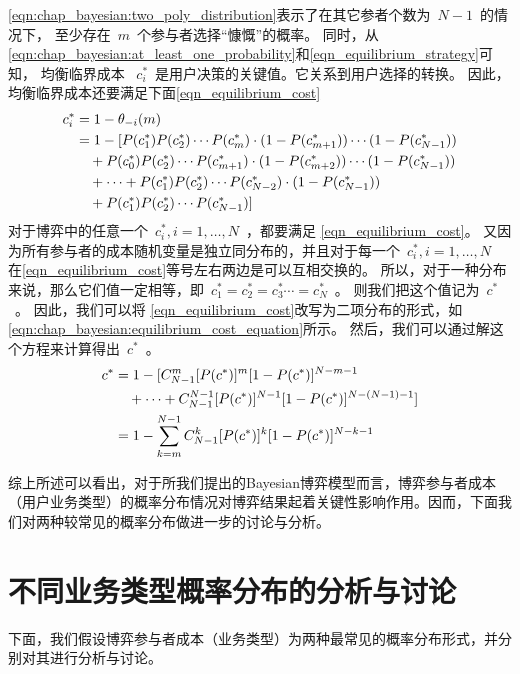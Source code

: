 \eqref{eqn:chap_bayesian:two_poly_distribution}表示了在其它参者个数为~$N-1$~的情况下，
至少存在~$m$~个参与者选择“慷慨”的概率。
同时，从\eqref{eqn:chap_bayesian:at_least_one_probability}和\eqref{eqn_equilibrium_strategy}可知，
均衡临界成本 ~$c_i^*$~是用户决策的关键值。它关系到用户选择的转换。
因此，均衡临界成本还要满足下面\eqref{eqn_equilibrium_cost}
\begin{align}
    c_i^* &= 1 - \theta_{-i} (m) \notag \\
     & =1 - [P(c_1^*)P(c_2^*)\cdots P(c_{m}^*) \cdot (1-P(c_{m+1}^*)) \cdots(1-P(c_{N-1}^*)) \notag \\ 
    & \quad +  P(c_0^*)P(c_2^*)\cdots P(c_{m+1}^*) \cdot (1-P(c_{m+2}^*)) \cdots(1-P(c_{N-1}^*)) \notag \\ 
    & \quad + \cdots  + P(c_1^*)P(c_2^*)\cdots P(c_{N-2}^*) \cdot (1-P(c_{N-1}^*)) \notag \\
    & \quad +  P(c_1^*)P(c_2^*)\cdots P(c_{N-1}^*) ]
    \label{eqn_equilibrium_cost} 
\end{align}
对于博弈中的任意一个~$c_i^*, i=1,\ldots, N$~，都要满足
\eqref{eqn_equilibrium_cost}。
又因为所有参与者的成本随机变量是独立同分布的，并且对于每一个~$c_i^*, i=1,\ldots, N$~
在\eqref{eqn_equilibrium_cost}等号左右两边是可以互相交换的。
所以，对于一种分布来说，那么它们值一定相等，即~$c_1^* = c_2^* = c_3^* \cdots = c_N^*$~。
则我们把这个值记为~$c^*$~。
因此，我们可以将 \eqref{eqn_equilibrium_cost}改写为二项分布的形式，如
\eqref{eqn:chap_bayesian:equilibrium_cost_equation}所示。
然后，我们可以通过解这个方程来计算得出~$c^*$~。
\begin{align}  
    c^* & =  1 - [ C_{N-1}^m [P(c^*)]^m [1-P(c^*)]^{N-m-1} \notag \\
   & \quad + \cdots + C_{N-1}^{N-1} [P(c^*)]^{N-1} [1-P(c^*)]^{N-(N-1)-1} ]\notag \\
   &= 1- \sum_{k=m}^{N-1}C_{N-1}^k [P(c^*)]^k [1-P(c^*)]^{N-k-1}
\label{eqn:chap_bayesian:equilibrium_cost_equation}
\end{align}

综上所述可以看出，对于所我们提出的Bayesian博弈模型而言，博弈参与者成本（用户业务类型）的概率分布情况对博弈结果起着关键性影响作用。因而，下面我们对两种较常见的概率分布做进一步的讨论与分析。

\section{不同业务类型概率分布的分析与讨论}
下面，我们假设博弈参与者成本（业务类型）为两种最常见的概率分布形式，并分别对其进行分析与讨论。
